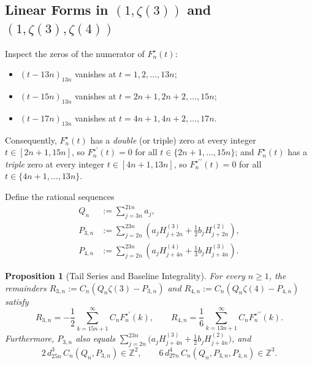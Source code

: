 \documentclass[11pt,reqno]{amsart}
\newtheorem{proposition}[theorem]{Proposition}
\theoremstyle{definition}
\theoremstyle{remark}
\newcommand{\ZZ}{\mathbb{Z}}
\begin{document}
\subsection{Linear Forms in \texorpdfstring{$(1, \zeta(3))$ and $(1, \zeta(3), \zeta(4))$}{(1, zeta(3)) and (1, zeta(3), zeta(4))}}
Inspect the zeros of the numerator of $F_n^{\star}(t)$:
\begin{itemize}
  \item $(t - 13n)_{13n}$ vanishes at $t = 1, 2, \ldots, 13n$;
  \item $(t - 15n)_{13n}$ vanishes at $t = 2n + 1, 2n + 2, \ldots, 15n$;
  \item $(t - 17n)_{13n}$ vanishes at $t = 4n + 1, 4n + 2, \ldots, 17n$.
\end{itemize}
Consequently, $F_n^{\star}(t)$ has a \emph{double} (or triple) zero at every integer $t \in [2n+1, 15n]$, so $F_n^{\star\prime}(t) = 0$ for all $t \in \{2n+1, \ldots, 15n\}$; and $F_n^{\star}(t)$ has a \emph{triple} zero at every integer $t \in [4n+1, 13n]$, so $F_n^{\star\prime\prime}(t) = 0$ for all $t \in \{4n+1, \ldots, 13n\}$.

Define the rational sequences
\begin{equation}
\label{eq:Q-P3-P4}
\begin{aligned}
  Q_n &:= \sum_{j = 3n}^{21n} a_j, \\
  P_{3,n} &:= \sum_{j = 2n}^{23n} \left(a_j H_{j + 2n}^{(3)} + \frac{1}{2} b_j H_{j + 2n}^{(2)}\right), \\
  P_{4,n} &:= \sum_{j = 2n}^{23n} \left(a_j H_{j + 4n}^{(4)} + \frac{1}{3} b_j H_{j + 4n}^{(3)}\right).
\end{aligned}
\end{equation}

\begin{proposition}[Tail Series and Baseline Integrality]
\label{prop:tails}
For every $n \ge 1$, the remainders $R_{3,n} := C_n(Q_n \zeta(3) - P_{3,n})$ and $R_{4,n} := C_n(Q_n \zeta(4) - P_{4,n})$ satisfy
\begin{equation}
\label{eq:R3-R4-tails}
  R_{3,n} = -\frac{1}{2} \sum_{k = 15n + 1}^{\infty} C_n F_n^{\star\prime}(k),
  \qquad
  R_{4,n} = \frac{1}{6} \sum_{k = 13n + 1}^{\infty} C_n F_n^{\star\prime\prime}(k).
\end{equation}
Furthermore, $P_{3,n}$ also equals $\sum_{j=2n}^{23n}\bigl(a_j H_{j+4n}^{(3)} + \frac{1}{2}b_j H_{j+4n}^{(2)}\bigr)$, and
\begin{equation}
\label{eq:baseline-int}
  2\, d_{25n}^3\, C_n (Q_n, P_{3,n}) \in \ZZ^2,
  \qquad
  6\, d_{27n}^4\, C_n (Q_n, P_{3,n}, P_{4,n}) \in \ZZ^3.
\end{equation}
\end{proposition}
\end{document}
